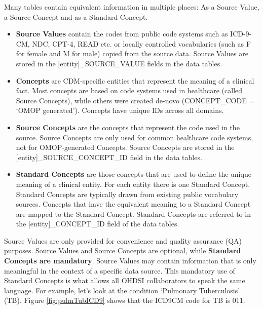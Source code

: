 \documentclass[]{book}
\providecommand{\tightlist}{%
  \setlength{\itemsep}{0pt}\setlength{\parskip}{0pt}}
\begin{document}
Many tables contain equivalent information in multiple places: As a
Source Value, a Source Concept and as a Standard Concept.

\begin{itemize}
\tightlist
\item
  \textbf{Source Values} contain the codes from public code systems such
  as ICD-9-CM, NDC, CPT-4, READ etc. or locally controlled vocabularies
  (such as F for female and M for male) copied from the source data.
  Source Values are stored in the {[}entity{]}\_SOURCE\_VALUE fields in
  the data tables.
\item
  \textbf{Concepts} are CDM-specific entities that represent the meaning
  of a clinical fact. Most concepts are based on code systems used in
  healthcare (called Source Concepts), while others were created de-novo
  (CONCEPT\_CODE = `OMOP generated'). Concepts have unique IDs across
  all domains.
\item
  \textbf{Source Concepts} are the concepts that represent the code used
  in the source. Source Concepts are only used for common healthcare
  code systems, not for OMOP-generated Concepts. Source Concepts are
  stored in the {[}entity{]}\_SOURCE\_CONCEPT\_ID field in the data
  tables.
\item
  \textbf{Standard Concepts} are those concepts that are used to define
  the unique meaning of a clinical entity. For each entity there is one
  Standard Concept. Standard Concepts are typically drawn from existing
  public vocabulary sources. Concepts that have the equivalent meaning
  to a Standard Concept are mapped to the Standard Concept. Standard
  Concepts are referred to in the {[}entity{]}\_CONCEPT\_ID field of the
  data tables.
\end{itemize}

Source Values are only provided for convenience and quality assurance
(QA) purposes. Source Values and Source Concepts are optional, while
\textbf{Standard Concepts are mandatory}. Source Values may contain
information that is only meaningful in the context of a specific data
source. This mandatory use of Standard Concepts is what allows all OHDSI
collaborators to speak the same language. For example, let's look at the
condition `Pulmonary Tuberculosis' (TB). Figure \ref{fig:pulmTubICD9}
shows that the ICD9CM code for TB is 011.
\end{document}
